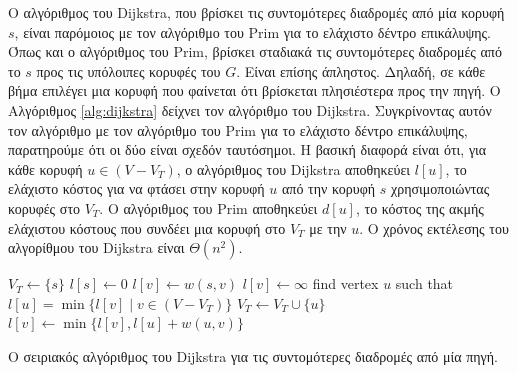 \documentclass[12pt,a4paper]{article}
\begin{document}
Ο αλγόριθμος του \foreignlanguage{english}{Dijkstra}, που βρίσκει τις συντομότερες διαδρομές από μία κορυφή $s$, είναι παρόμοιος με τον αλγόριθμο του \foreignlanguage{english}{Prim} για το ελάχιστο δέντρο επικάλυψης. Όπως και ο αλγόριθμος του \foreignlanguage{english}{Prim}, βρίσκει σταδιακά τις συντομότερες διαδρομές από το $s$ προς τις υπόλοιπες κορυφές του $G$. Είναι επίσης άπληστος. Δηλαδή, σε κάθε βήμα επιλέγει μια κορυφή που φαίνεται ότι βρίσκεται πλησιέστερα προς την πηγή. Ο Αλγόριθμος \ref{alg:dijkstra} δείχνει τον αλγόριθμο του \foreignlanguage{english}{Dijkstra}. Συγκρίνοντας αυτόν τον αλγόριθμο με τον αλγόριθμο του \foreignlanguage{english}{Prim} για το ελάχιστο δέντρο επικάλυψης, παρατηρούμε ότι οι δύο είναι σχεδόν ταυτόσημοι. Η βασική διαφορά είναι ότι, για κάθε κορυφή $u \in (V - V_T)$, ο αλγόριθμος του \foreignlanguage{english}{Dijkstra} αποθηκεύει $l[u]$, το ελάχιστο κόστος για να φτάσει στην κορυφή $u$ από την κορυφή $s$ χρησιμοποιώντας κορυφές στο $V_T$. O αλγόριθμος του \foreignlanguage{english}{Prim} αποθηκεύει $d[u]$, το κόστος της ακμής ελάχιστου κόστους που συνδέει μια κορυφή στο $V_T$ με την $u$. Ο χρόνος εκτέλεσης του αλγορίθμου του \foreignlanguage{english}{Dijkstra} είναι $\Theta(n^2)$.


\begin{algorithm}[H]
\begin{algorithmic}[1]
    \State $V_T \gets \{s\}$
    \State $l[s] \gets 0$
            \State $l[v] \gets w(s, v)$
        \Else
            \State $l[v] \gets \infty$
        \EndIf
    \EndFor
        \State find vertex $u$ such that $l[u] = \min\{l[v] \mid v \in (V - V_T)\}$
        \State $V_T \gets V_T \cup \{u\}$
            \State $l[v] \gets \min\{l[v], l[u] + w(u, v)\}$
        \EndFor
    \EndWhile
\EndProcedure
\end{algorithmic}
\end{algorithm}


{\raggedright{} Ο σειριακός αλγόριθμος του \foreignlanguage{english}{Dijkstra} για τις συντομότερες διαδρομές από μία πηγή.\label{alg:dijkstra}\par}
\vspace{0.3cm}
 
\end{document}
